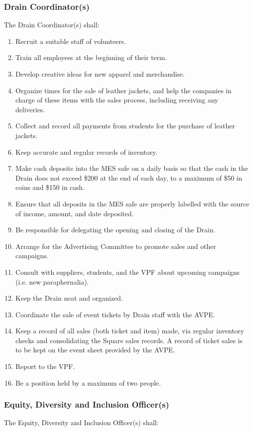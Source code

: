 \subsubsection{Drain Coordinator(s)}
\label{drain-coordinators}
The Drain Coordinator(s) shall:

\begin{enumerate}
 \item
  Recruit a suitable staff of volunteers.
 \item
  Train all employees at the beginning of their term.
 \item
  Develop creative ideas for new apparel and merchandise.
 \item
  Organize times for the sale of leather jackets, and help the companies in charge of these items with the sales process, including receiving any deliveries.
 \item
  Collect and record all payments from students for the purchase of leather jackets.
 \item
  Keep accurate and regular records of inventory.
 \item
  Make cash deposits into the MES safe on a daily basis so that the cash in the Drain does not exceed \$200 at the end of each day, to a maximum of \$50 in coins and \$150 in cash.
 \item
  Ensure that all deposits in the MES safe are properly labelled with the source of income, amount, and date deposited.
 \item
  Be responsible for delegating the opening and closing of the Drain.
 \item
  Arrange for the Advertising Committee to promote sales and other campaigns.
 \item
  Consult with suppliers, students, and the VPF about upcoming campaigns (i.e. new paraphernalia).
 \item
  Keep the Drain neat and organized.
 \item
  Coordinate the sale of event tickets by Drain staff with the AVPE.
 \item
  Keep a record of all sales (both ticket and item) made, via regular inventory checks and consolidating the Square sales records. A record of ticket sales is to be kept on the event sheet provided by the AVPE.
 \item
  Report to the VPF.
 \item
  Be a position held by a maximum of two people.
\end{enumerate}

\subsubsection{Equity, Diversity and Inclusion Officer(s)}
\label{equity-diversity-and-inclusion-officers}
The Equity, Diversity and Inclusion Officer(s) shall:


